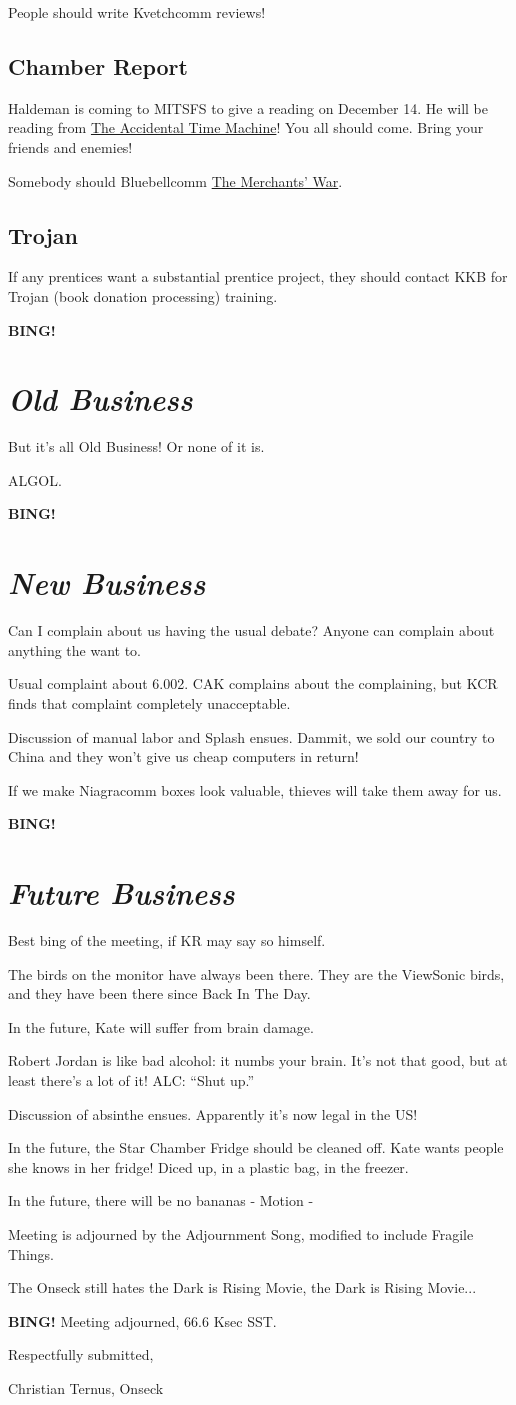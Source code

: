 \documentclass[10pt]{article}
\newcommand{\bing}{{\bf BING!} }
\newcommand{\goto}[1]{\bing \vskip 12pt \section*{{\em{#1}}}}
\begin{document}
People should write Kvetchcomm reviews!

\subsection*{Chamber Report}

Haldeman is coming to MITSFS to give a reading on December 14. He will be reading from \underline{The Accidental Time Machine}! You all should come.  Bring your friends and enemies!

Somebody should Bluebellcomm \underline{The Merchants' War}.

\subsection*{Trojan}

If any prentices want a substantial prentice project, they should contact KKB for Trojan (book donation processing) training.

\goto{Old Business}

But it's all Old Business!  Or none of it is.

ALGOL.

\goto{New Business}

Can I complain about us having the usual debate?  Anyone can complain about anything the want to.

Usual complaint about 6.002.  CAK complains about the complaining, but KCR finds that complaint completely unacceptable.

Discussion of manual labor and Splash ensues.  Dammit, we sold our country to China and they won't give us cheap computers in return!

If we make Niagracomm boxes look valuable, thieves will take them away for us.

\goto{Future Business}

Best bing of the meeting, if KR may say so himself.

The birds on the monitor have always been there.  They are the ViewSonic birds, and they have been there since Back In The Day.

In the future, Kate will suffer from brain damage.

Robert Jordan is like bad alcohol: it numbs your brain.  It's not that good, but at least there's a lot of it!  ALC: ``Shut up.''

Discussion of absinthe ensues.  Apparently it's now legal in the US!

In the future, the Star Chamber Fridge should be cleaned off.  Kate wants people she knows in her fridge!  Diced up, in a plastic bag, in the freezer.

In the future, there will be no bananas - Motion - 

Meeting is adjourned by the Adjournment Song, modified to include Fragile Things.

The Onseck still hates the Dark is Rising Movie, the Dark is Rising Movie...

\bing
\noindent
Meeting adjourned, 66.6 Ksec SST.

\vspace{18pt}

\centerline{Respectfully submitted,}
\centerline{Christian Ternus, Onseck}
\end{document}
